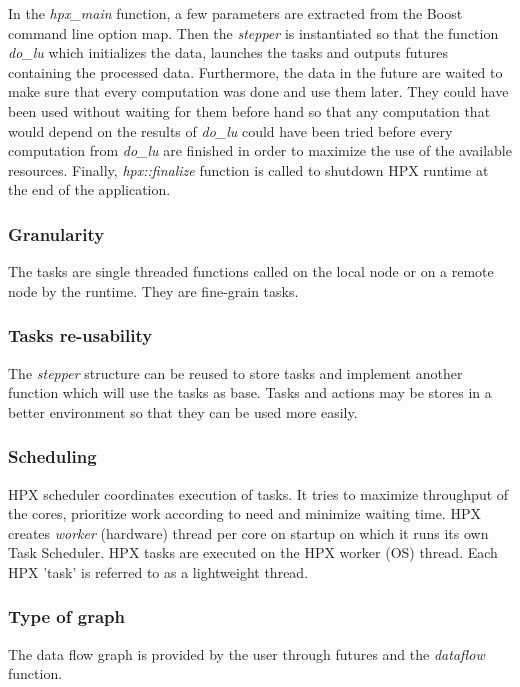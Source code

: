 In the \textit{hpx\_main} function, a few parameters are extracted from the Boost command line option map.
Then the \textit{stepper} is instantiated so that the function \textit{do\_lu} which initializes the data, launches the tasks and outputs futures containing the processed data.
Furthermore, the data in the future are waited to make sure that every computation was done and use them later.
They could have been used without waiting for them before hand so that any computation that would depend on the results of \textit{do\_lu} could have been tried before every computation from \textit{do\_lu} are finished in order to maximize the use of the available resources.
Finally, \textit{hpx::finalize} function is called to shutdown HPX runtime at the end of the application.


\begin{figure}[t]

\end{figure}

\subsubsection{Granularity}
The tasks are single threaded functions called on the local node or on a remote node by the runtime.
They are fine-grain tasks.

\subsubsection{Tasks re-usability}
The \textit{stepper} structure can be reused to store tasks and implement another function which will use the tasks as base.
Tasks and actions may be stores in a better environment so that they can be used more easily.

\subsubsection{Scheduling}
HPX scheduler coordinates execution of tasks.
It tries to maximize throughput of the cores, prioritize work according to need and minimize waiting time.
HPX creates \textit{worker} (hardware) thread per core on startup on which it runs its own Task Scheduler.
HPX tasks are executed on the HPX worker (OS) thread.
Each HPX 'task' is referred to as a lightweight thread.

\subsubsection{Type of graph}
The data flow graph is provided by the user through futures and the \textit{dataflow} function.

